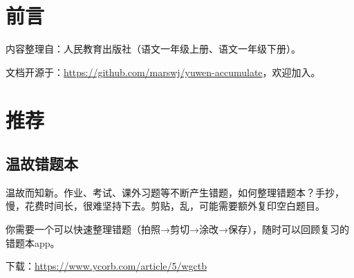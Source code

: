 \chapter{前言}
内容整理自：人民教育出版社（语文一年级上册、语文一年级下册）。

文档开源于：\url{https://github.com/marswj/yuwen-accumulate}，欢迎加入。

\chapter{推荐}
\section{温故错题本}
温故而知新。作业、考试、课外习题等不断产生错题，如何整理错题本？手抄，慢，花费时间长，很难坚持下去。剪贴，乱，可能需要额外复印空白题目。

你需要一个可以快速整理错题（拍照→剪切→涂改→保存），随时可以回顾复习的错题本app。

下载：\url{https://www.ycorb.com/article/5/wgctb}